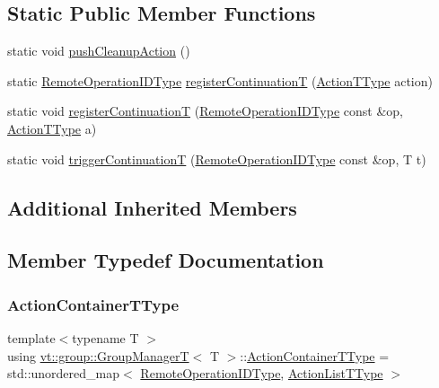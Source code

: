 \subsection*{Static Public Member Functions}
\begin{DoxyCompactItemize}
\item 
static void \hyperlink{structvt_1_1group_1_1_group_manager_t_ad149f3bfcb76761f22283a1bf6b147d0}{push\+Cleanup\+Action} ()
\item 
static \hyperlink{namespacevt_1_1group_a73f2624ddeb535b39a08b6524f26b244}{Remote\+Operation\+I\+D\+Type} \hyperlink{structvt_1_1group_1_1_group_manager_t_aa52eafbcdd4d1e8da4f17ef4cd03098a}{register\+ContinuationT} (\hyperlink{structvt_1_1group_1_1_group_manager_t_acb20922687d3165d97de391fdbaf02ca}{Action\+T\+Type} action)
\item 
static void \hyperlink{structvt_1_1group_1_1_group_manager_t_a0c366044c727d883691f89550c9706cd}{register\+ContinuationT} (\hyperlink{namespacevt_1_1group_a73f2624ddeb535b39a08b6524f26b244}{Remote\+Operation\+I\+D\+Type} const \&op, \hyperlink{structvt_1_1group_1_1_group_manager_t_acb20922687d3165d97de391fdbaf02ca}{Action\+T\+Type} a)
\item 
static void \hyperlink{structvt_1_1group_1_1_group_manager_t_a654b43bfc4360ba5c7f4a1680378bdad}{trigger\+ContinuationT} (\hyperlink{namespacevt_1_1group_a73f2624ddeb535b39a08b6524f26b244}{Remote\+Operation\+I\+D\+Type} const \&op, T t)
\end{DoxyCompactItemize}
\subsection*{Additional Inherited Members}


\subsection{Member Typedef Documentation}
\mbox{\label{structvt_1_1group_1_1_group_manager_t_adc0d6d680c4f8bdbb80cd90f84a5f7ee}} 
\subsubsection{\texorpdfstring{Action\+Container\+T\+Type}{ActionContainerTType}}
{\footnotesize\ttfamily template$<$typename T $>$ \\
using \hyperlink{structvt_1_1group_1_1_group_manager_t}{vt\+::group\+::\+Group\+ManagerT}$<$ T $>$\+::\hyperlink{structvt_1_1group_1_1_group_manager_t_adc0d6d680c4f8bdbb80cd90f84a5f7ee}{Action\+Container\+T\+Type} =  std\+::unordered\+\_\+map$<$ \hyperlink{namespacevt_1_1group_a73f2624ddeb535b39a08b6524f26b244}{Remote\+Operation\+I\+D\+Type}, \hyperlink{structvt_1_1group_1_1_group_manager_t_a653158254f8de50d4070f0621644a48a}{Action\+List\+T\+Type} $>$}

